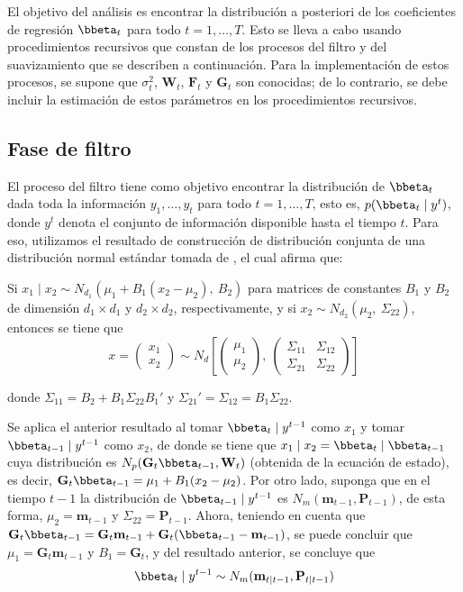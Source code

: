El objetivo del análisis es encontrar la distribución a posteriori de los coeficientes de regresión $\bbeta_t$ para todo $t=1,\ldots,T$. Esto se lleva a cabo usando procedimientos recursivos que constan de los procesos del filtro y del suavizamiento que se describen a continuación. Para la implementación de estos procesos, se supone que $\sigma^2_t$, $\mathbf{W}_t$, $\mathbf{F}_t$ y $\mathbf{G}_t$ son conocidas; de lo contrario, se debe incluir la estimación de estos parámetros en los procedimientos recursivos.

\subsection{Fase de filtro}
El proceso del filtro tiene como objetivo encontrar la distribución de $\bbeta_t$ dada toda la información $y_1,\ldots,y_t$ para todo $t=1,\ldots,T$, esto es, $p(\bbeta_t\mid y^t)$, donde $y^t$ denota el conjunto de información disponible hasta el tiempo $t$. Para eso, utilizamos el resultado de construcción de distribución conjunta de una distribución normal estándar tomada de , el cual afirma que:
\begin{Res}
Si $x_1\mid x_2\sim N_{d_1}(\mu_1+B_1(x_2-\mu_2),\ B_2)$ para matrices de constantes $B_1$ y $B_2$ de dimensión $d_1\times d_1$ y $d_2\times d_2$, respectivamente, y si $x_2\sim N_{d_2}(\mu_2,\ \Sigma_{22})$, entonces se tiene que 
\begin{equation*}
x=\begin{pmatrix}x_1\\x_2\end{pmatrix}\sim N_d\left[\begin{pmatrix}\mu_1\\\mu_2\end{pmatrix},\ \begin{pmatrix}\Sigma_{11}&\Sigma_{12}\\\Sigma_{21}&\Sigma_{22}\end{pmatrix}\right]
\end{equation*}

donde $\Sigma_{11}=B_2+B_1\Sigma_{22}B_1'$ y $\Sigma_{21}'=\Sigma_{12}=B_1\Sigma_{22}$.
\end{Res}

Se aplica el anterior resultado al tomar $\bbeta_{t} \mid y^{t-1}$  como $x_1$ y tomar $\bbeta_{t-1} \mid y^{t-1}$ como $x_2$, de donde se tiene que $x_1 \mid x_2=\bbeta_t \mid \bbeta_{t-1}$ cuya distribución es $N_p(\mathbf{G}_t\bbeta_{t-1},\mathbf{W}_t)$ (obtenida de la ecuación de estado), es decir, $\mathbf{G}_t\bbeta_{t-1}=\mu_1+B_1(x_2-\mu_2)$. Por otro lado, suponga que en el tiempo $t-1$ la distribución de $\bbeta_{t-1} \mid y^{t-1}$ es $N_m(\mathbf{m}_{t-1},\mathbf{P}_{t-1})$, de esta forma, $\mu_2=\mathbf{m}_{t-1}$ y $\Sigma_{22}=\mathbf{P}_{t-1}$. Ahora, teniendo en cuenta que $\mathbf{G}_t\bbeta_{t-1}=\mathbf{G}_t\mathbf{m}_{t-1}+\mathbf{G}_t(\bbeta_{t-1}-\mathbf{m}_{t-1})$, se puede concluir que $\mu_1=\mathbf{G}_t\mathbf{m}_{t-1}$ y $B_1=\mathbf{G}_t$, y del resultado anterior, se concluye que
\begin{equation}\label{t_t-1}
\bbeta_t \mid y^{t-1}\sim N_m(\mathbf{m}_{t\mid t-1},\mathbf{P}_{t\mid t-1})
\end{equation}

